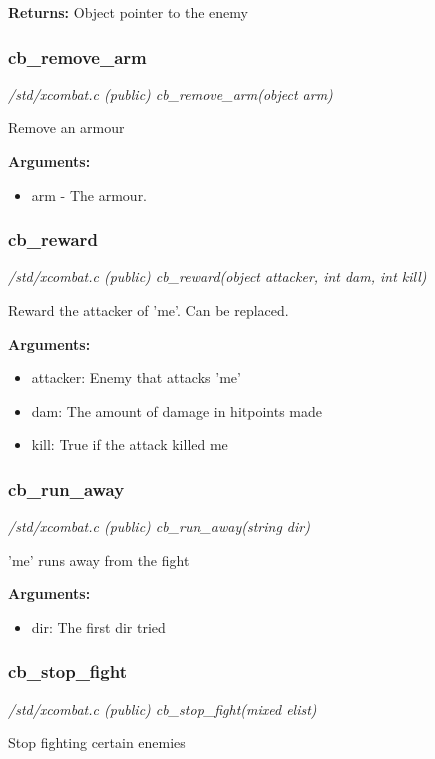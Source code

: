 {\bf Returns:}        Object pointer to the enemy


\subsubsection{cb\_remove\_arm}

{\em /std/xcombat.c (public) cb\_remove\_arm(object arm)}

Remove an armour

{\bf Arguments:}
\begin{itemize}
\item     arm - The armour.
\end{itemize}


\subsubsection{cb\_reward}

{\em /std/xcombat.c (public) cb\_reward(object attacker, int dam, int kill)}

Reward the attacker of 'me'. Can be replaced.

{\bf Arguments:}
\begin{itemize}
\item     attacker:   Enemy that attacks 'me'
\item dam:        The amount of damage in hitpoints made
\item kill:       True if the attack killed me
\end{itemize}


\subsubsection{cb\_run\_away}

{\em /std/xcombat.c (public) cb\_run\_away(string dir)}

'me' runs away from the fight

{\bf Arguments:}
\begin{itemize}
\item      dir: The first dir tried
\end{itemize}


\subsubsection{cb\_stop\_fight}

{\em /std/xcombat.c (public) cb\_stop\_fight(mixed elist)}

Stop fighting certain enemies


